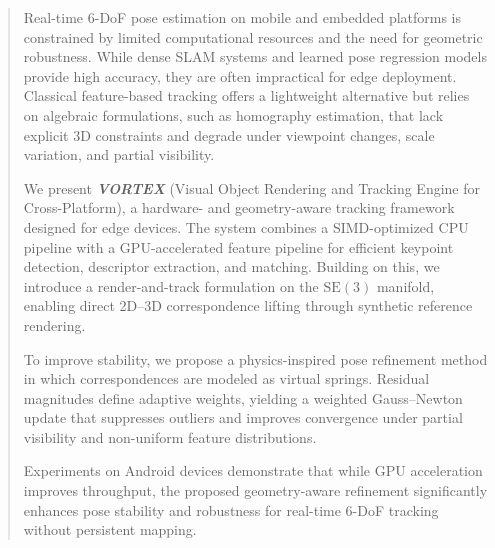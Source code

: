 \begin{abstract}
Real-time 6-DoF pose estimation on mobile and embedded platforms is constrained by limited computational resources and the need for geometric robustness. While dense SLAM systems and learned pose regression models provide high accuracy, they are often impractical for edge deployment. Classical feature-based tracking offers a lightweight alternative but relies on algebraic formulations, such as homography estimation, that lack explicit 3D constraints and degrade under viewpoint changes, scale variation, and partial visibility.

We present \textbf{\textit{VORTEX}} (Visual Object Rendering and Tracking Engine for Cross-Platform), a hardware- and geometry-aware tracking framework designed for edge devices. The system combines a SIMD-optimized CPU pipeline with a GPU-accelerated feature pipeline for efficient keypoint detection, descriptor extraction, and matching. Building on this, we introduce a render-and-track formulation on the $\mathrm{SE}(3)$ manifold, enabling direct 2D--3D correspondence lifting through synthetic reference rendering.

To improve stability, we propose a physics-inspired pose refinement method in which correspondences are modeled as virtual springs. Residual magnitudes define adaptive weights, yielding a weighted Gauss--Newton update that suppresses outliers and improves convergence under partial visibility and non-uniform feature distributions.

Experiments on Android devices demonstrate that while GPU acceleration improves throughput, the proposed geometry-aware refinement significantly enhances pose stability and robustness for real-time 6-DoF tracking without persistent mapping.
\end{abstract}

